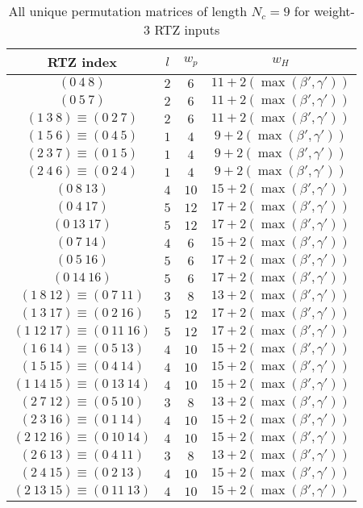 \documentclass[11pt, oneside, dvipdfmx]{book}
\begin{document}
\begin{table}
\centering
\begin{tabular}{||c |c  |c  |c |} 
 \hline
 RTZ index  & $ l$ & $w_p$& $w_H$\\
 \hline
 $(0~4~8)$ & $2$ & $6$ & $11+2(\max{(\beta',\gamma')})$\\
 \hline
 $(0~5~7)$ &  $2$ & $6$ &$11+2(\max{(\beta',\gamma')})$\\
 \hline
 $(1~3~8) \equiv (0~2~7)$ &  $2$ & $6$ & $11+2(\max{(\beta',\gamma')})$\\
 \hline
 $(1~5~6) \equiv(0~4~5)$ &  $1$ & $4$ & $9+2(\max{(\beta',\gamma')})$\\
 \hline
 $(2~3~7)\equiv(0~1~5)$ & $1$ & $4$ & $9+2(\max{(\beta',\gamma')})$\\
 \hline
 $(2~4~6)\equiv(0~2~4)$ & $1$ & $4$ & $9+2(\max{(\beta',\gamma')})$\\
 \hline\hline
  $(0~8~13)$ & $4$ & $10$ & $15+2(\max{(\beta',\gamma')})$\\
 \hline
 $(0~4~17)$ & $5$ & $12$ & $17+2(\max{(\beta',\gamma')})$\\
 \hline
 $(0~13~17)$ & $5$ & $12$ & $17+2(\max{(\beta',\gamma')})$\\
 \hline
  $(0~7~14)$ &  $4$ & $6$ &$15+2(\max{(\beta',\gamma')})$\\
 \hline
  $(0~5~16)$ &  $5$ & $6$ &$17+2(\max{(\beta',\gamma')})$\\
 \hline
  $(0~14~16)$ &  $5$ & $6$ &$17+2(\max{(\beta',\gamma')})$\\
 \hline
 $(1~8~12) \equiv (0~7~11)$ &  $3$ & $8$ & $13+2(\max{(\beta',\gamma')})$\\
 \hline
 $(1~3~17) \equiv (0~2~16)$ &  $5$ & $12$ & $17+2(\max{(\beta',\gamma')})$\\
 \hline
 $(1~12~17) \equiv (0~11~16)$ & $5$ & $12$ & $17+2(\max{(\beta',\gamma')})$\\
 \hline
  $(1~6~14) \equiv(0~5~13)$ &  $4$ & $10$ & $15+2(\max{(\beta',\gamma')})$\\
 \hline
  $(1~5~15) \equiv(0~4~14)$ &  $4$ & $10$ & $15+2(\max{(\beta',\gamma')})$\\
 \hline
  $(1~14~15) \equiv(0~13~14)$ &  $4$ & $10$ & $15+2(\max{(\beta',\gamma')})$\\
 \hline
 $(2~7~12)\equiv(0~5~10)$ & $3$ & $8$ & $13+2(\max{(\beta',\gamma')})$\\
 \hline
 $(2~3~16)\equiv(0~1~14)$ & $4$ & $10$ & $15+2(\max{(\beta',\gamma')})$\\
 \hline
 $(2~12~16)\equiv(0~10~14)$ & $4$ & $10$ & $15+2(\max{(\beta',\gamma')})$\\
 \hline
  $(2~6~13)\equiv(0~4~11)$ & $3$ & $8$ & $13+2(\max{(\beta',\gamma')})$\\
 \hline
  $(2~4~15)\equiv(0~2~13)$ & $4$ & $10$ & $15+2(\max{(\beta',\gamma')})$\\
 \hline
  $(2~13~15)\equiv(0~11~13)$ & $4$ & $10$ & $15+2(\max{(\beta',\gamma')})$\\
 \hline
\end{tabular}
\caption{All unique permutation matrices of length $N_c =9$ for weight-$3$ RTZ inputs}
\label{tb3}
\end{table}
\end{document}
